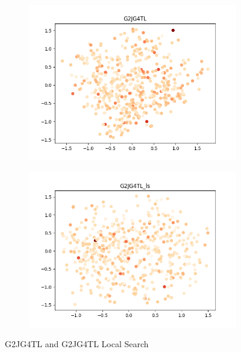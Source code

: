 \documentclass[11pt, letterpaper, onecolumn]{article}
\begin{document}
\begin{figure}[h!]
  \centering
  \begin{subfigure}[b]{0.4\linewidth}
    \includegraphics[width=\linewidth]{graphs/G2JG4TL__pca.png}
  \end{subfigure}
  \begin{subfigure}[b]{0.4\linewidth}
    \includegraphics[width=\linewidth]{graphs/G2JG4TL_ls__pca.png}
  \end{subfigure}
  \caption{G2JG4TL and G2JG4TL Local Search}
  \label{fig:coffee}
\end{figure}

\clearpage 




\end{document}
